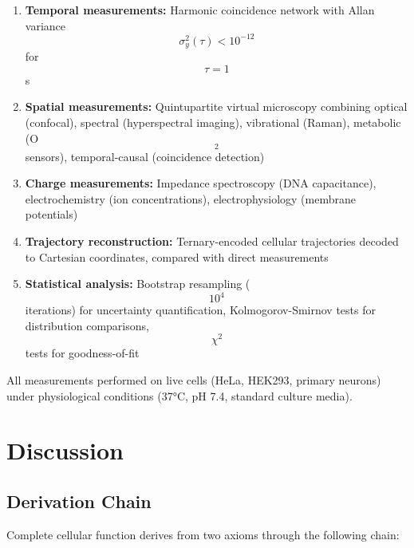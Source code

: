 \documentclass[11pt,twocolumn,a4paper]{article}
\theoremstyle{remark}
\begin{document}
\begin{enumerate}
\item \textbf{Temporal measurements:} Harmonic coincidence network with Allan variance $$\sigma_y^2(\tau) < 10^{-12}$$ for $$\tau = 1$$ s

\item \textbf{Spatial measurements:} Quintupartite virtual microscopy combining optical (confocal), spectral (hyperspectral imaging), vibrational (Raman), metabolic (O$$_2$$ sensors), temporal-causal (coincidence detection)

\item \textbf{Charge measurements:} Impedance spectroscopy (DNA capacitance), electrochemistry (ion concentrations), electrophysiology (membrane potentials)

\item \textbf{Trajectory reconstruction:} Ternary-encoded cellular trajectories decoded to Cartesian coordinates, compared with direct measurements

\item \textbf{Statistical analysis:} Bootstrap resampling ($$10^4$$ iterations) for uncertainty quantification, Kolmogorov-Smirnov tests for distribution comparisons, $$\chi^2$$ tests for goodness-of-fit
\end{enumerate}

All measurements performed on live cells (HeLa, HEK293, primary neurons) under physiological conditions (\ang{37}C, pH 7.4, standard culture media).




\section{Discussion}
\label{sec:discussion}

\subsection{Derivation Chain}

Complete cellular function derives from two axioms through the following chain:
\end{document}

